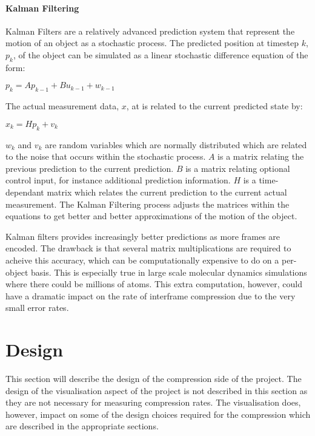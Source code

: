 \documentclass[a4paper,11pt]{report}
\begin{document}
\subsubsection*{Kalman Filtering}

Kalman Filters are a relatively advanced prediction system that represent the motion of an object as a stochastic process.\cite{welch1995ikf} The predicted position at timestep $k$, $p_k$, of the object can be simulated as a linear stochastic difference equation of the form:
\begin{center} $p_k = Ap_{k-1} + Bu_{k-1} + w_{k-1}$  \end{center}
The actual measurement data, $x$, at is related to the current predicted state by:
\begin{center} $x_k = Hp_k + v_k$ \end{center}
$w_k$ and $v_k$ are random variables which are normally distributed which are related to the noise that occurs within the stochastic process. $A$ is a matrix relating the previous prediction to the current prediction. $B$ is a matrix relating optional control input, for instance additional prediction information. $H$ is a time-dependant matrix which relates the current prediction to the current actual measurement. The Kalman Filtering process adjusts the matrices within the equations to get better and better approximations of the motion of the object.

Kalman filters provides increasingly better predictions as more frames are encoded. The drawback is that several matrix multiplications are required to acheive this accuracy, which can be computationally expensive to do on a per-object basis. This is especially true in large scale molecular dynamics simulations where there could be millions of atoms. This extra computation, however, could have a dramatic impact on the rate of interframe compression due to the very small error rates.

\chapter{Design}

This section will describe the design of the compression side of the project. The design of the visualisation aspect of the project is not described in this section as they are not necessary for measuring compression rates. The visualisation does, however, impact on some of the design choices required for the compression which are described in the appropriate sections.
\end{document}
